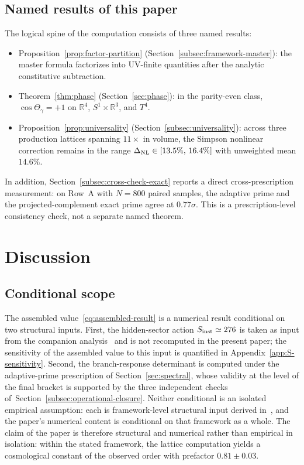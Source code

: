 \documentclass[a4paper,11pt]{article}
\theoremstyle{definition}
\newcommand{\bR}{\mathbb{R}}
\begin{document}
\subsection{Named results of this paper}
\label{subsec:named-results}

The logical spine of the computation consists of three named
results:
\begin{itemize}
\item Proposition~\ref{prop:factor-partition}
(Section~\ref{subsec:framework-master}): the master formula factorizes
into UV-finite quantities after the analytic constitutive
subtraction.
\item Theorem~\ref{thm:phase} (Section~\ref{sec:phase}): in the
parity-even class, $\cos\Theta_\gamma = +1$ on $\bR^4$,
$S^1 \times \bR^3$, and $T^4$.
\item Proposition~\ref{prop:universality}
(Section~\ref{subsec:universality}): across three production lattices
spanning $11\times$ in volume, the Simpson nonlinear correction
remains in the range $\Delta_{\rm NL} \in [13.5\%,\,16.4\%]$ with
unweighted mean $14.6\%$.
\end{itemize}
In addition, Section~\ref{subsec:cross-check-exact} reports a direct
cross-prescription measurement: on Row~A with $N = 800$ paired
samples, the adaptive prime and the projected-complement exact
prime agree at $0.77\sigma$. This is a prescription-level
consistency check, not a separate named theorem.

\section{Discussion}
\label{sec:discussion}

\subsection{Conditional scope}
\label{subsec:discussion-scope}

The assembled value~\eqref{eq:assembled-result} is a numerical
result conditional on two structural inputs. First, the
hidden-sector action $S_{\rm inst} \simeq 276$ is taken as input
from the companion analysis~\cite{companion-structural} and is not
recomputed in the present paper; the sensitivity of the assembled
value to this input is quantified in
Appendix~\ref{app:S-sensitivity}. Second, the branch-response
determinant is computed under the adaptive-prime prescription of
Section~\ref{sec:spectral}, whose validity at the level of the
final bracket is supported by the three independent checks
of~Section~\ref{subsec:operational-closure}. Neither conditional is an
isolated empirical assumption: each is framework-level structural
input derived in~\cite{companion-structural}, and the paper's
numerical content is conditional on that framework as a whole. The
claim of the paper is therefore structural and numerical rather
than empirical in isolation: within the stated framework, the
lattice computation yields a cosmological constant of the observed
order with prefactor $0.81 \pm 0.03$.
\end{document}
